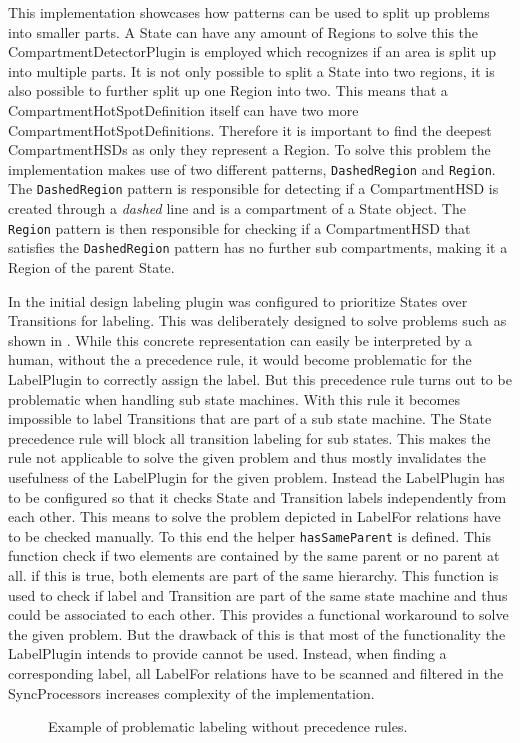This implementation showcases how patterns can be used to split up problems into smaller parts. A State can have any amount of Regions to solve this the CompartmentDetectorPlugin is employed which recognizes if an area is split up into multiple parts. It is not only possible to split a State into two regions, it is also possible to further split up one Region into two. This means that a CompartmentHotSpotDefinition itself can have two more CompartmentHotSpotDefinitions. Therefore it is important to find the deepest CompartmentHSDs as only they represent a Region. To solve this problem the implementation makes use of two different patterns, \texttt{DashedRegion} and \texttt{Region}. The \texttt{DashedRegion} pattern is responsible for detecting if a CompartmentHSD is created through a \emph{dashed} line and is a compartment of a State object. The \texttt{Region} pattern is then responsible for checking if a CompartmentHSD that satisfies the \texttt{DashedRegion} pattern has no further sub compartments, making it a Region of the parent State.

In the initial design labeling plugin was configured to prioritize States over Transitions for labeling. This was deliberately designed to solve problems such as shown in . While this concrete representation can easily be interpreted by a human, without the a precedence rule, it would become problematic for the LabelPlugin to correctly assign the label. But this precedence rule turns out to be problematic when handling sub state machines. With this rule it becomes impossible to label Transitions that are part of a sub state machine. The State precedence rule will block all transition labeling for sub states. This makes the rule not applicable to solve the given problem and thus mostly invalidates the usefulness of the LabelPlugin for the given problem. Instead the LabelPlugin has to be configured so that it checks State and Transition labels independently from each other. This means to solve the problem depicted in  LabelFor relations have to be checked manually. To this end the helper  \texttt{hasSameParent} is defined. This function check if two elements are contained by the same parent or no parent at all. if this is true, both elements are part of the same hierarchy. This function is used to check if label and Transition are part of the same state machine and thus could be associated to each other. This provides a functional workaround to solve the given problem. But the drawback of this is that most of the functionality the LabelPlugin intends to provide cannot be used. Instead, when finding a corresponding label, all LabelFor relations have to be scanned and filtered in the SyncProcessors increases complexity of the implementation.  

\begin{figure}
\centering

\caption{Example of problematic labeling without precedence rules.}
\label{fig:close-enough}
\end{figure}

